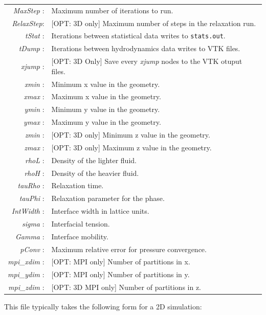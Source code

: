 \documentclass[12pt]{report}
\begin{document}
\begin{longtable}{rl}
\textit{MaxStep}  :& Maximum number of iterations to run.\\
\textit{RelaxStep}:& [OPT: 3D only] Maximum number of steps in the relaxation run.\\
\textit{tStat}    :& Iterations between statistical data writes to \verb+stats.out+.\\
\textit{tDump}    :& Iterations between hydrodynamics data writes to VTK files.\\
\textit{xjump}    :& [OPT: 3D Only] Save every {\it xjump} nodes to the VTK otuput files.\\ 
\textit{xmin}     :& Minimum x value in the geometry.\\
\textit{xmax}     :& Maximum x value in the geometry.\\
\textit{ymin}     :& Minimum y value in the geometry.\\
\textit{ymax}     :& Maximum y value in the geometry.\\
\textit{zmin}     :& [OPT: 3D only] Minimum z value in the geometry.\\
\textit{zmax}     :& [OPT: 3D only] Maximum z value in the geometry.\\
\textit{rhoL}     :& Density of the lighter fluid.\\
\textit{rhoH}     :& Density of the heavier fluid.\\
\textit{tauRho}   :& Relaxation time.\\
\textit{tauPhi}   :& Relaxation parameter for the phase.\\
\textit{IntWidth} :& Interface width in lattice units.\\
\textit{sigma}    :& Interfacial tension.\\
\textit{Gamma}    :& Interface mobility.\\
\textit{pConv}    :& Maximum relative error for pressure convergence.\\
\textit{mpi\_xdim} :& [OPT: MPI only] Number of partitions in x.\\
\textit{mpi\_ydim} :& [OPT: MPI only] Number of partitions in y.\\
\textit{mpi\_zdim} :& [OPT: 3D MPI only] Number of partitions in z.\\
\end{longtable}

This file typically takes the following form for a 2D simulation:
\end{document}
